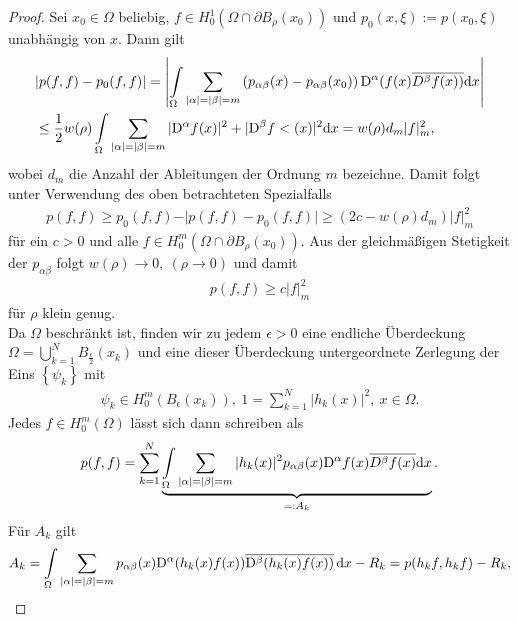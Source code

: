 \begin{proof}
Sei $x_0\in \Omega$ beliebig, $f\in H_0^1\left(\Omega\cap \partial B_\rho(x_0)\right)$ und $p_0(x, \xi):=p(x_0,\xi)$ unabhängig von $x$. Dann gilt
\begin{align}
\begin{split}
	&\vert p(f,f)-p_0(f,f)\vert=\left\vert \int\limits_\Omega\sum\limits_{\vert\alpha\vert=\vert\beta\vert =m} \left(p_{\alpha\beta}(x)-p_{\alpha\beta}(x_0)\right){\mathrm D^\alpha(f(x)}\overline{D^\beta f(x))}\mathrm{d}x\right\vert\\
	&\le \frac{1}{2}w(\rho)\int\limits_\Omega \sum\limits_{\vert\alpha\vert=\vert\beta\vert =m}  \vert \mathrm D^\alpha f(x)\vert^2+\vert \mathrm D^\beta f<(x) \vert^2 \mathrm{d}x = w(\rho)d_m\vert f\vert_m^2,
	\end{split}
\end{align}
wobei $d_m$ die Anzahl der Ableitungen der Ordnung $m$ bezeichne. Damit folgt unter Verwendung des oben betrachteten Spezialfalls
\begin{align}
	p(f,f) \ge p_0(f,f)-\vert p(f,f)-p_0(f,f)\vert \ge (2c-w(\rho)d_m)\vert f\vert_m^2
\end{align} 
für ein $c>0$ und alle $f\in H_0^m\left(\Omega \cap \partial B_\rho(x_0)\right)$. Aus der gleichmäßigen Stetigkeit der $p_{\alpha\beta}$ folgt $w(\rho) \rightarrow 0, \ (\rho \rightarrow 0)$ und damit 
\begin{align}
	p(f,f) \ge c\vert f\vert_m^2
\end{align}
für $\rho$ klein genug.\\
Da $\Omega$ beschränkt ist, finden wir zu jedem $\epsilon>0$ eine endliche Überdeckung $\Omega=\bigcup_{k=1}^N B_{\frac{\epsilon}{2}}(x_k)$ und eine dieser Überdeckung untergeordnete Zerlegung der Eins $\left\{\psi_k\right\}$ mit
\begin{align}
 \psi_k \in H_0^m\left(B_\epsilon (x_k)\right),\  1=\sum\limits_{k=1}^N \vert h_k(x)\vert^2, \ x\in \Omega.
\end{align}
Jedes $f\in H_0^m(\Omega)$ lässt sich dann schreiben als
\begin{align}
	p(f,f) = \sum\limits_{k=1}^N\underbrace{\int\limits_\Omega \sum\limits_{\vert\alpha\vert=\vert\beta\vert=m}\vert h_k(x)\vert^2p_{\alpha\beta}(x)\mathrm D^\alpha f(x)\overline{D^\beta f(x)}\mathrm{d}x}_{=:A_k}.
\end{align}
Für $A_k$ gilt
\begin{align}
	A_k= \int\limits_\Omega \sum\limits_{\vert\alpha\vert=\vert\beta\vert=m}p_{\alpha\beta}(x)\mathrm D^\alpha(h_k(x)f(x))\overline{\mathrm D^\beta(h_k(x)f(x))}\,\mathrm d x -R_k=p(h_kf,h_kf)-R_k,
\end{align}

\end{proof}
